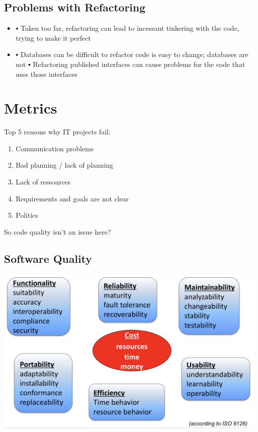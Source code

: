 \documentclass[10pt]{article}
\begin{document}
	\subsection{Problems with Refactoring}
	\begin{itemize}
		\item ▪ Taken too far, refactoring can lead to incessant tinkering with the code, trying to make it perfect
		\item ▪ Databases can be difficult to refactor
code is easy to change; databases are not
▪ Refactoring published interfaces can cause problems for the code that uses those interfaces
	\end{itemize}

	
	\newpage
	
	\section{Metrics}
	Top 5 reasons why IT projects fail:
	\begin{enumerate}
		\item Communication problems
		\item Bad planning / lack of planning
		\item Lack of ressources
		\item Requirements and goals are not clear
		\item Politics
	\end{enumerate}
	So code quality isn’t an issue here?
	\subsection{Software Quality}
	\includegraphics[scale=0.4]{assets/software_quality}
	
\end{document}
